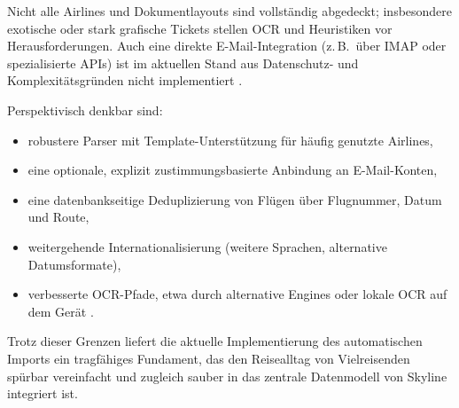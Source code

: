 Nicht alle Airlines und Dokumentlayouts sind vollständig abgedeckt; insbesondere exotische oder stark grafische Tickets stellen OCR und Heuristiken vor Herausforderungen.
Auch eine direkte E-Mail-Integration (z.\,B.\ über IMAP oder spezialisierte APIs) ist im aktuellen Stand aus Datenschutz- und Komplexitätsgründen nicht implementiert \cite{gdpr,edpbArt25}.

Perspektivisch denkbar sind:

\begin{itemize}
  \item robustere Parser mit Template-Unterstützung für häufig genutzte Airlines,
  \item eine optionale, explizit zustimmungsbasierte Anbindung an E-Mail-Konten,
  \item eine datenbankseitige Deduplizierung von Flügen über Flugnummer, Datum und Route,
  \item weitergehende Internationalisierung (weitere Sprachen, alternative Datumsformate),
  \item verbesserte OCR-Pfade, etwa durch alternative Engines oder lokale OCR auf dem Gerät \cite{mlKitTextRecognition,tesseractOcr}.
\end{itemize}

Trotz dieser Grenzen liefert die aktuelle Implementierung des automatischen Imports ein tragfähiges Fundament, das den Reisealltag von Vielreisenden spürbar vereinfacht und zugleich sauber in das zentrale Datenmodell von Skyline integriert ist.
